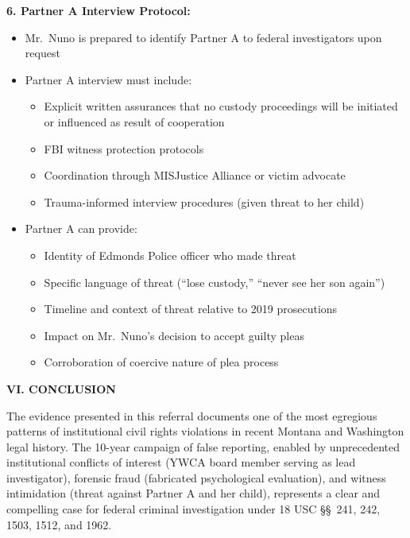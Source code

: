 \documentclass[11pt, letterpaper]{article}
\newcommand{\sectiontitle}[1]{\vspace{0.2in}\noindent\textcolor{NavyBlue}{\large\textbf{#1}}\vspace{0.1in}}
\newcommand{\subsectiontitle}[1]{\vspace{0.15in}\noindent\textcolor{NavyBlue}{\textbf{#1}}\vspace{0.05in}}
\begin{document}
\subsectiontitle{6. Partner A Interview Protocol:}
\begin{itemize}[leftmargin=*,itemsep=2pt]
    \item Mr.\ Nuno is prepared to identify Partner A to federal investigators upon request
    \item Partner A interview must include:
    \begin{itemize}[leftmargin=*,itemsep=2pt]
        \item Explicit written assurances that no custody proceedings will be initiated or influenced as result of cooperation
        \item FBI witness protection protocols
        \item Coordination through MISJustice Alliance or victim advocate
        \item Trauma-informed interview procedures (given threat to her child)
    \end{itemize}
    \item Partner A can provide:
    \begin{itemize}[leftmargin=*,itemsep=2pt]
        \item Identity of Edmonds Police officer who made threat
        \item Specific language of threat (``lose custody,'' ``never see her son again'')
        \item Timeline and context of threat relative to 2019 prosecutions
        \item Impact on Mr.\ Nuno's decision to accept guilty pleas
        \item Corroboration of coercive nature of plea process
    \end{itemize}
\end{itemize}

\sectiontitle{VI. CONCLUSION}

The evidence presented in this referral documents one of the most egregious patterns of institutional civil rights violations in recent Montana and Washington legal history. The 10-year campaign of false reporting, enabled by unprecedented institutional conflicts of interest (YWCA board member serving as lead investigator), forensic fraud (fabricated psychological evaluation), and witness intimidation (threat against Partner A and her child), represents a clear and compelling case for federal criminal investigation under 18 USC \S\S\ 241, 242, 1503, 1512, and 1962.
\end{document}
